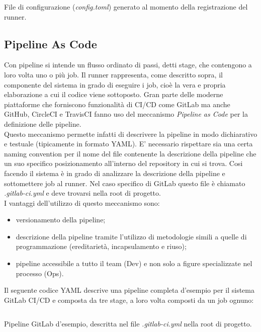 \begin{listing}[H]
\inputminted{toml}{code/4-macos-runner-config}
\caption{File di configurazione (\textit{config.toml}) generato al momento della registrazione del runner.}
\end{listing}

\subsection{Pipeline As Code}
Con pipeline si intende un flusso ordinato di passi, detti stage, che contengono a loro volta uno o più job.
Il runner rappresenta, come descritto sopra, il componente del sistema in grado di eseguire i job, cioè la vera e propria elaborazione a cui il codice viene sottoposto. Gran parte delle moderne piattaforme che forniscono funzionalità di CI/CD come GitLab ma anche GitHub, CircleCI e TravisCI fanno uso del meccanismo \textit{Pipeline as Code} per la definizione delle pipeline.\\
Questo meccanismo permette infatti di descrivere la pipeline in modo dichiarativo e testuale (tipicamente in formato YAML). E' necessario rispettare sia una certa naming convention per il nome del file contenente la descrizione della pipeline che un suo specifico posizionamento all'interno del repository in cui si trova. Cosi facendo il sistema è in grado di analizzare la descrizione della pipeline e sottomettere job al runner. Nel caso specifico di GitLab questo file è chiamato \textit{.gitlab-ci.yml} e deve trovarsi nella root di progetto.\\
I vantaggi dell'utilizzo di questo meccanismo sono:
\begin{itemize}
    \item versionamento della pipeline;
    \item descrizione della pipeline tramite l'utilizzo di metodologie simili a quelle di programmazione (ereditarietà, incapsulamento e riuso);
    \item pipeline accessibile a tutto il team (Dev) e non solo a figure specializzate nel processo (Ops).
\end{itemize}

Il seguente codice YAML descrive una pipeline completa d'esempio per il sistema GitLab CI/CD e composta da tre stage, a loro volta composti da un job ognuno:
\begin{listing}[H]
\inputminted{yaml}{code/3-pipelineexample}
\caption{Pipeline GitLab d'esempio, descritta nel file \textit{.gitlab-ci.yml} nella root di progetto.}
\end{listing}

